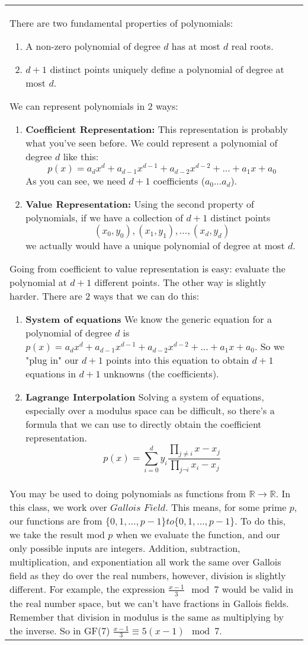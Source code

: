 {\tabulinesep=1mm
\begin{tabu}{|p{16cm} |}
\hline
There are two fundamental properties of polynomials:
\begin{enumerate}
    \item A non-zero polynomial of degree $d$ has at most $d$ real roots.
    \item $d + 1$ distinct points uniquely define a polynomial of degree at most $d$.
\end{enumerate}
We can represent polynomials in 2 ways:
\begin{enumerate}
    \item \textbf{Coefficient Representation:} This representation is probably what you've seen before. We could represent a polynomial of degree $d$ like this:
    \[p(x) = a_dx^d + a_{d-1}x^{d-1} + a_{d-2}x^{d-2} + ... +a_1x + a_0\]
    As you can see, we need $d+1$ coefficients ($a_0...a_d$).
    \item \textbf{Value Representation:} Using the second property of polynomials, if we have a collection of $d+1$ distinct points
    \[(x_0, y_0), (x_1, y_1), ... , (x_d, y_d)\]
    we actually would have a unique polynomial of degree at most $d$.
\end{enumerate}
Going from coefficient to value representation is easy: evaluate the polynomial at $d+1$ different points. The other way is slightly harder. There are 2 ways that we can do this:
\begin{enumerate}
    \item \textbf{System of equations} We know the generic equation for a polynomial of degree $d$ is $p(x) = a_dx^d + a_{d-1}x^{d-1} + a_{d-2}x^{d-2} + ... +a_1x + a_0$. So we "plug in" our $d+1$ points into this equation to obtain $d+1$ equations in $d+1$ unknowns (the coefficients). 
    \item \textbf{Lagrange Interpolation} Solving a system of equations, especially over a modulus space can be difficult, so there's a formula that we can use to directly obtain the coefficient representation. 
   \[p(x) = \sum_{i=0}^{d}y_i  \frac{\prod_{j\neq i}x-x_j}{\prod_{j\neg i}x_i -x_j}\] 
\end{enumerate} \\
You may be used to doing polynomials as functions from $\mathbb{R}\to\mathbb{R}$. In this class, we work over $\textit{Gallois Field}$. This means, for some prime $p$, our functions are from $ \{0,1,...,p-1\} to \{0,1,...,p-1\}$. To do this, we take the result mod $p$ when we evaluate the function, and our only possible inputs are integers. Addition, subtraction, multiplication, and exponentiation all work the same over Gallois field as they do over the real numbers, however, division is slightly different. For example, the expression $\frac{x-1}{3} \mod 7$ would be valid in the real number space, but we can't have fractions in Gallois fields. Remember that division in modulus is the same as multiplying by the inverse. So in GF(7) $\frac{x-1}{3} \equiv 5(x-1) \mod 7$. 
\\
\hline
\end{tabu}
}
